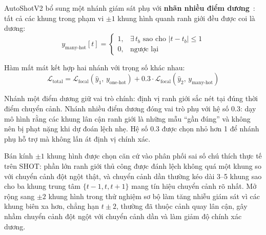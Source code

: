 AutoShotV2 bổ sung một nhánh giám sát phụ với \textbf{nhãn nhiều điểm dương}~\cite{Muller2019LabelSmoothing}: tất cả các khung trong phạm vi $\pm1$ khung hình quanh ranh giới đều được coi là dương:
\begin{equation}
    y_{\text{many-hot}}[t] =
    \begin{cases}
        1, & \exists\, t_b \text{ sao cho } |t - t_b| \le 1 \\
        0, & \text{ngược lại}
    \end{cases}
\end{equation}

Hàm mất mát kết hợp hai nhánh với trọng số khác nhau:
\begin{equation}
    \mathcal{L}_{\text{total}} = \mathcal{L}_{\text{focal}}(\hat{y}_1,\,y_{\text{one-hot}}) + 0.3\cdot\mathcal{L}_{\text{focal}}(\hat{y}_2,\,y_{\text{many-hot}})
    \label{eq:total_loss}
\end{equation}

Nhánh một điểm dương giữ vai trò chính: định vị ranh giới sắc nét tại đúng thời điểm chuyển cảnh. Nhánh nhiều điểm dương đóng vai trò phụ với hệ số 0.3: dạy mô hình rằng các khung lân cận ranh giới là những mẫu ``gần đúng'' và không nên bị phạt nặng khi dự đoán lệch nhẹ. Hệ số 0.3 được chọn nhỏ hơn 1 để nhánh phụ hỗ trợ mà không lấn át định vị chính xác.

Bán kính $\pm 1$ khung hình được chọn căn cứ vào phân phối sai số chú thích thực tế trên SHOT: phần lớn ranh giới thủ công được đánh lệch không quá một khung so với chuyển cảnh đột ngột thật, và chuyển cảnh dần thường kéo dài 3--5 khung sao cho ba khung trung tâm $\{t-1, t, t+1\}$ mang tín hiệu chuyển cảnh rõ nhất. Mở rộng sang $\pm 2$ khung hình trong thử nghiệm sơ bộ làm tăng nhiễu giám sát vì các khung biên xa hơn, chẳng hạn $t \pm 2$, thường đã thuộc cảnh quay lân cận, gây nhầm chuyển cảnh đột ngột với chuyển cảnh dần và làm giảm độ chính xác dương.

